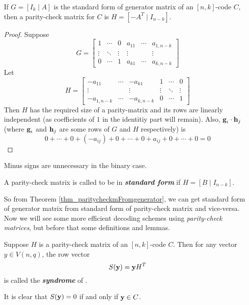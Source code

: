 \documentclass[../main.tex]{subfiles}
\begin{document}
\begin{thm}\label{thm_paritycheckmFromgenerator}
	If $G=[I_k \;|\; A]$ is the standard form of generator matrix of an $[n,k]$-code $C$, then a parity-check matrix for $C$ is $H=[-A^T \;|\; I_{n-k}]$.
\end{thm}
\begin{proof}
	Suppose
	\[
		G=	\left[
			\begin{array}{ccc|ccc}
			1 & \cdots  & 0 & a_{11} & \cdots & a_{1,n-k}\\
			\vdots & \ddots & \vdots & \vdots & & \vdots\\
			0 & \cdots & 1 & a_{k1} & \cdots & a_{k,n-k}
			\end{array}
			\right]
	\]
	Let
	\[
		H = \left[
			\begin{array}{ccc|ccc}
			-a_{11} & \cdots  & -a_{k1} & 1 & \cdots & 0\\
			\vdots &  & \vdots & \vdots & \ddots & \vdots\\
			-a_{1,n-k} & \cdots & -a_{k,n-k} & 0 & \cdots & 1
			\end{array}
			\right]
	\]
	Then $H$ has the required size of a parity-matrix and its rows are linearly independent (as coefficients of $1$ in the identitiy part will remain). Also, $\textbf{g}_i\cdot \textbf{h}_j$ (where $\textbf{g}_i$ and $\textbf{h}_j$ are some rows of $G$ and $H$ respectively) is
	\[
		0+\cdots+0+(-a_{ij})+0+\cdots+0+a_{ij}+0+\cdots+0 = 0
	\]
\end{proof}
\begin{remark}
	Minus signs are unnecessary in the binary case.
\end{remark}

\begin{defn}
	A parity-check matrix is called to be in \textbf{\emph{standard form}} if $H=[B \;|\; I_{n-k}]$.
\end{defn}
So from Theorem \ref{thm_paritycheckmFromgenerator}, we can get standard form of generator matrix from standard form of parity-check matrix and vice-versa.\\

Now we will see some more efficient decoding schemes using \emph{parity-check matrices}, but before that some definitions and lemmas.

\begin{defn}
	Suppose $H$ is a parity-check matrix of an $[n,k]$-code $C$. Then for any vector $y\in V(n,q)$, the row vector
	\[
		S(\textbf{y})= \textbf{y}H^T
	\]
	is called the \textbf{\emph{syndrome}} of .
\end{defn}
It is clear that $S(\textbf{y})=0$ if and only if $\textbf{y}\in C$.
\end{document}
